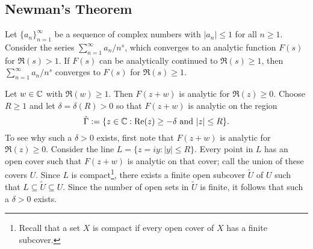 \subsection{Newman's Theorem}

\begin{thm}[Newman]
Let $\{a_n\}_{n=1}^\infty$ be a sequence of complex numbers with $|a_n| \leq 1$ for all $n \geq 1$. 
Consider the series $\sum_{n=1}^\infty a_n/n^s$, which converges to an analytic function 
$F(s)$ for $\Re(s) > 1$. If $F(s)$ can be analytically continued to $\Re(s) \geq 1$, then 
$\sum_{n=1}^\infty a_n/n^s$ converges to $F(s)$ for $\Re(s) \geq 1$. 
\end{thm}
\begin{pf}
Let $w \in \mathbb{C}$ with $\Re(w) \geq 1$. Then $F(z+w)$ is analytic for $\Re(z) \geq 0$. Choose 
$R \geq 1$ and let $\delta = \delta(R) > 0$ so that $F(z+w)$ is analytic on the region 
\[ \tilde\Gamma := \{z \in \mathbb{C} : {\rm Re}(z) \geq -\delta \text{ and } |z| \leq R\}. \]
To see why such a $\delta > 0$ exists, first note that $F(z+w)$ is analytic for $\Re(z) \geq 0$. 
Consider the line $L = \{z = iy : |y| \leq R\}$. Every point in $L$ has an open cover such that 
$F(z+w)$ is analytic on that cover; call the union of these covers $U$. Since $L$ is compact\footnote{Recall that a set $X$ is compact if every open cover of $X$ has a finite subcover.}, there exists a finite open subcover $\tilde U$ of $U$ such that 
$L \subseteq \tilde U \subseteq U$. Since the number of open sets in $\tilde U$ is finite, 
it follows that such a $\delta > 0$ exists.


\end{pf}
